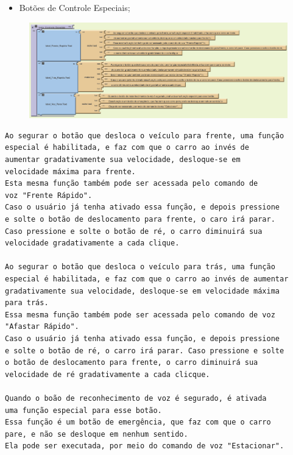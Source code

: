 \documentclass[portugues, brazil, a4paper,12pt]{article}
\begin{document}
\begin{itemize}
\item Botões de Controle Especiais;
\end{itemize}
\begin{figure}[H]
	\centering
	\includegraphics[scale=.7]{img/ajuda/especial.png}
	
\end{figure}
\begin{verbatim}
Ao segurar o botão que desloca o veículo para frente, uma função 
especial é habilitada, e faz com que o carro ao invés de 
aumentar gradativamente sua velocidade, desloque-se em 
velocidade máxima para frente.
Esta mesma função também pode ser acessada pelo comando de 
voz "Frente Rápido".
Caso o usuário já tenha ativado essa função, e depois pressione 
e solte o botão de deslocamento para frente, o caro irá parar. 
Caso pressione e solte o botão de ré, o carro diminuirá sua 
velocidade gradativamente a cada clique.

Ao segurar o botão que desloca o veículo para trás, uma função 
especial é habilitada, e faz com que o carro ao invés de aumentar 
gradativamente sua velocidade, desloque-se em velocidade máxima 
para trás.
Essa mesma função também pode ser acessada pelo comando de voz 
"Afastar Rápido".
Caso o usuário já tenha ativado essa função, e depois pressione 
e solte o botão de ré, o carro irá parar. Caso pressione e solte 
o botão de deslocamento para frente, o carro diminuirá sua 
velocidade de ré gradativamente a cada clicque.

Quando o boão de reconhecimento de voz é segurado, é ativada 
uma função especial para esse botão.
Essa função é um botão de emergência, que faz com que o carro 
pare, e não se desloque em nenhum sentido.
Ela pode ser executada, por meio do comando de voz "Estacionar".

\end{verbatim}
\end{document}
